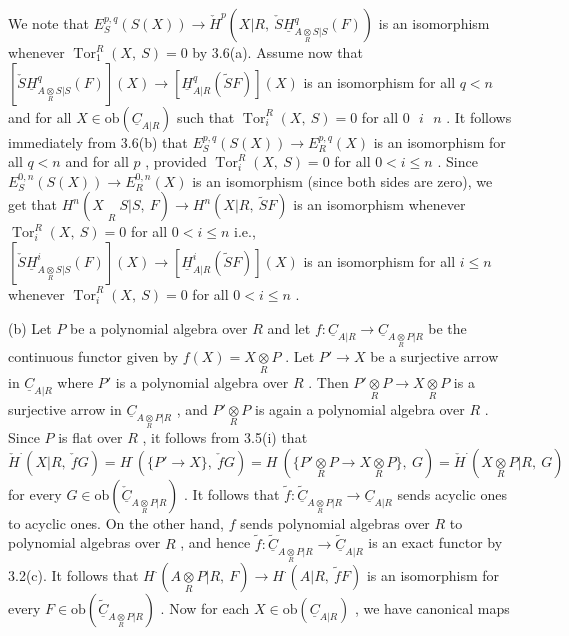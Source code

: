 We note that  $E^{p,q}_{S}(S(X)) \to \check{H}^{p}(X|R,\ \check{S}\underline{H}^{q}_{A\underset{R}{\otimes}S|S}(F))$  is an isomorphism whenever $\operatorname{Tor}^{R}_{1}(X,\ S) = 0$  by 3.6(a). Assume now that $[\check{S}\underline{H}^{q}_{A\underset{R}{\otimes}S|S}(F)](X) \to [\underline{H}^{q}_{A|R}(\widetilde{S}F)](X)$  is an isomorphism for all  $q < n$  and for all $X \in \mathrm{ob}(\underline{C}_{A|R})$  such that  $\operatorname{Tor}^{R}_{i}(X,\ S) = 0$  for all  $0\ \ \ i\ \ \ n$ . It follows immediately from 3.6(b) that  $E^{p,q}_{S}(S(X)) \to E^{p,q}_{R}(X)$  is an isomorphism for all  $q < n$ and for all  $p$ , provided  $\operatorname{Tor}^{R}_{i}(X,\ S) = 0$  for all  $0 < i \leq n$ . Since $E^{0,n}_{S}(S(X)) \to E^{0,n}_{R}(X)$  is an isomorphism (since both sides are zero), we get that $H^{n}(X\underset{R}{\phantom{\otimes}}S|S,\ F) \to H^{n}(X|R,\ \widetilde{S}F)$  is an isomorphism whenever  $\operatorname{Tor}^{R}_{i}(X,\ S) = 0$  for all $0 < i \leq n$  i.e.,  $[\check{S}\underline{H}^{i}_{A\underset{R}{\otimes}S|S}(F)](X) \to [\underline{H}^{i}_{A|R}(\widetilde{S}F)](X)$  is an isomorphism for all $i \leq n$  whenever  $\operatorname{Tor}^{R}_{i}(X,\ S) = 0$  for all  $0 < i \leq n$ .

(b)  Let  $P$  be a polynomial algebra over  $R$  and  let $f : \underline{C}_{A|R} \to \underline{C}_{A\underset{R}{\otimes}P|R}$  be the continuous functor given by  $f(X) = X\underset{R}{\otimes}P$ . Let  $P' \to X$ be a surjective arrow in  $\underline{C}_{A|R}$  where  $P'$  is a polynomial algebra over  $R$ . Then $P'\underset{R}{\otimes}P \to X\underset{R}{\otimes}P$  is a surjective arrow in  $\underline{C}_{A\underset{R}{\otimes}P|R}$ , and  $P'\underset{R}{\otimes}P$  is again a polynomial algebra over  $R$ . Since  $P$  is flat over  $R$ , it follows from 3.5(i) that $\check{H}^{\cdot}(X|R,\ \check{f}G) = H^{\cdot}(\{P' \to X\},\ \check{f}G) = H\ (\{P'\underset{R}{\otimes}P \to X\underset{R}{\otimes}P\},\ G) = \check{H}^{\cdot}(X\underset{R}{\otimes}P|R,\ G)$ for every  $G \in \mathrm{ob}(\underline{\check{C}}_{A\underset{R}{\otimes}P|R})$ . It follows that  $\widetilde{f} : \underline{\widetilde{C}}_{A\underset{R}{\otimes}P|R} \to \underline{C}_{A|R}$  sends acyclic ones to acyclic ones. On the other hand,  $f$  sends polynomial algebras over  $R$  to polynomial algebras over  $R$ , and hence  $\widetilde{f} : \underline{\widetilde{C}}_{A\underset{R}{\otimes}P|R} \to\!\underline{\widetilde{C}}_{A|R}$  is an exact functor by 3.2(c). It follows that  $H^{\cdot}(A\underset{R}{\otimes}P|R,\ F) \to H^{\cdot}(A|R,\ \widetilde{f}F)$  is an isomorphism for every $F \in \mathrm{ob}(\underline{\widetilde{C}}_{A\underset{R}{\otimes}P|R})$ . Now for each  $X \in \mathrm{ob}(\underline{C}_{A|R})$ , we have canonical maps

